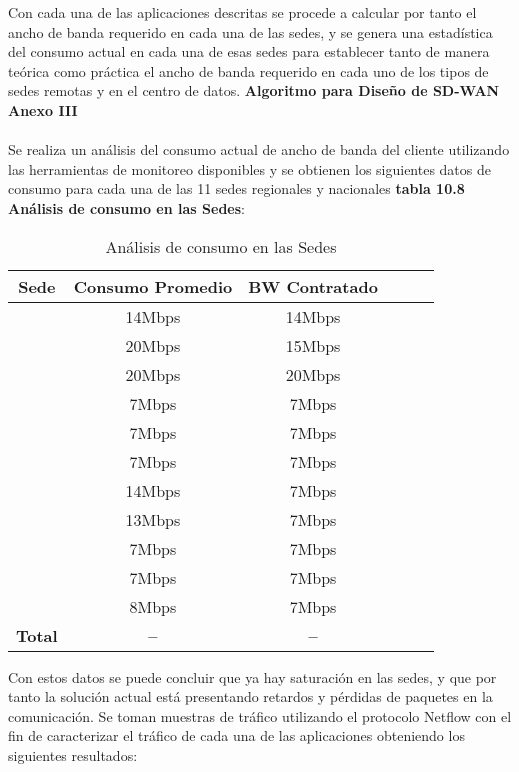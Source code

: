 Con cada una de las aplicaciones descritas se procede a calcular por tanto el ancho de banda requerido en cada una de las sedes, y se genera una estadística del consumo actual en cada una de esas sedes para establecer tanto de manera teórica como práctica el ancho de banda requerido en cada uno de los tipos de sedes remotas y en el centro de datos. \textbf{Algoritmo para Diseño de SD-WAN Anexo III}
\\
\\
Se realiza un análisis del consumo actual de ancho de banda del cliente utilizando las herramientas de monitoreo disponibles y se obtienen los siguientes datos de consumo para cada una de las 11 sedes regionales y nacionales \textbf{tabla 10.8 Análisis de consumo en las Sedes}:
\begin{table}[ht]
	\caption{Análisis de consumo en las Sedes}
	\label{tab:hla:results}
\centering
\begin{tabular}{lccccc}
	\toprule
	\multicolumn{1}{c}{\textbf{Sede}} 	& \textbf{Consumo Promedio}	& \textbf{BW Contratado}\\
	\midrule
\cite{Nacional Medellin} 		& 14Mbps & 14Mbps \\
\cite{Antioquia Norte} 		& 20Mbps & 15Mbps \\
\cite{Nacional Tocancipa} 		& 20Mbps & 20Mbps \\
\cite{Soacha} 		& 7Mbps & 7Mbps \\
\cite{Antioquia Sur} 		& 7Mbps & 7Mbps \\
\cite{Antioquia Oriente} 		& 7Mbps & 7Mbps \\
\cite{Eje Cafetero} 		& 14Mbps & 7Mbps \\
\cite{Valle} 		& 13Mbps & 7Mbps \\
\cite{Cota} 		& 7Mbps & 7Mbps \\
\cite{Bucaramanga} 		& 7Mbps & 7Mbps \\
\cite{Funza} 		& 8Mbps & 7Mbps \\
	\midrule
	\textbf{Total}			& \textbf{--}		& \textbf{--} \\
	\bottomrule
\end{tabular}
\end{table}

Con estos datos se puede concluir que ya hay saturación en las sedes, y que por tanto la solución actual está presentando retardos y pérdidas de paquetes en la comunicación.
Se toman muestras de tráfico utilizando el protocolo Netflow con el fin de caracterizar el tráfico de cada una de las aplicaciones obteniendo los siguientes resultados:

